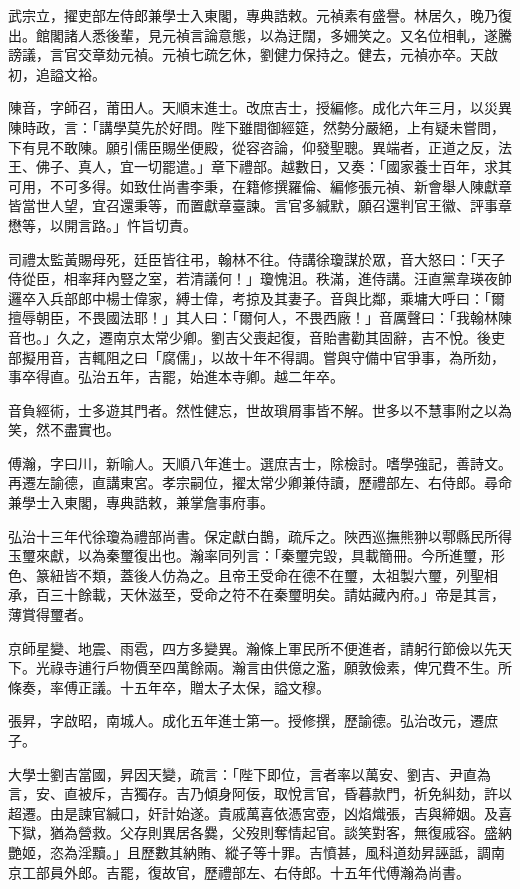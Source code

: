 \begin{pinyinscope}
武宗立，擢吏部左侍郎兼學士入東閣，專典誥敕。元禎素有盛譽。林居久，晚乃復出。館閣諸人悉後輩，見元禎言論意態，以為迂闊，多姍笑之。又名位相軋，遂騰謗議，言官交章劾元禎。元禎七疏乞休，劉健力保持之。健去，元禎亦卒。天啟初，追謚文裕。

陳音，字師召，莆田人。天順末進士。改庶吉士，授編修。成化六年三月，以災異陳時政，言：「講學莫先於好問。陛下雖間御經筵，然勢分嚴絕，上有疑未嘗問，下有見不敢陳。願引儒臣賜坐便殿，從容咨論，仰發聖聰。異端者，正道之反，法王、佛子、真人，宜一切罷遣。」章下禮部。越數日，又奏：「國家養士百年，求其可用，不可多得。如致仕尚書李秉，在籍修撰羅倫、編修張元禎、新會舉人陳獻章皆當世人望，宜召還秉等，而置獻章臺諫。言官多緘默，願召還判官王徽、評事章懋等，以開言路。」忤旨切責。

司禮太監黃賜母死，廷臣皆往弔，翰林不往。侍講徐瓊謀於眾，音大怒曰：「天子侍從臣，相率拜內豎之室，若清議何！」瓊愧沮。秩滿，進侍講。汪直黨韋瑛夜帥邏卒入兵部郎中楊士偉家，縛士偉，考掠及其妻子。音與比鄰，乘墉大呼曰：「爾擅辱朝臣，不畏國法耶！」其人曰：「爾何人，不畏西廠！」音厲聲曰：「我翰林陳音也。」久之，遷南京太常少卿。劉吉父喪起復，音貽書勸其固辭，吉不悅。後吏部擬用音，吉輒阻之曰「腐儒」，以故十年不得調。嘗與守備中官爭事，為所劾，事卒得直。弘治五年，吉罷，始進本寺卿。越二年卒。

音負經術，士多遊其門者。然性健忘，世故瑣屑事皆不解。世多以不慧事附之以為笑，然不盡實也。

傅瀚，字曰川，新喻人。天順八年進士。選庶吉士，除檢討。嗜學強記，善詩文。再遷左諭德，直講東宮。孝宗嗣位，擢太常少卿兼侍讀，歷禮部左、右侍郎。尋命兼學士入東閣，專典誥敕，兼掌詹事府事。

弘治十三年代徐瓊為禮部尚書。保定獻白鵲，疏斥之。陜西巡撫熊翀以鄠縣民所得玉璽來獻，以為秦璽復出也。瀚率同列言：「秦璽完毀，具載簡冊。今所進璽，形色、篆紐皆不類，蓋後人仿為之。且帝王受命在德不在璽，太祖製六璽，列聖相承，百三十餘載，天休滋至，受命之符不在秦璽明矣。請姑藏內府。」帝是其言，薄賞得璽者。

京師星變、地震、雨雹，四方多變異。瀚條上軍民所不便進者，請躬行節儉以先天下。光祿寺逋行戶物價至四萬餘兩。瀚言由供億之濫，願敦儉素，俾冗費不生。所條奏，率傅正議。十五年卒，贈太子太保，謚文穆。

張昇，字啟昭，南城人。成化五年進士第一。授修撰，歷諭德。弘治改元，遷庶子。

大學士劉吉當國，昇因天變，疏言：「陛下即位，言者率以萬安、劉吉、尹直為言，安、直被斥，吉獨存。吉乃傾身阿佞，取悅言官，昏暮款門，祈免糾劾，許以超遷。由是諫官緘口，奸計始遂。貴戚萬喜依憑宮壺，凶焰熾張，吉與締姻。及喜下獄，猶為營救。父存則異居各爨，父歿則奪情起官。談笑對客，無復戚容。盛納艷姬，恣為淫黷。」且歷數其納賄、縱子等十罪。吉憤甚，風科道劾昇誣詆，調南京工部員外郎。吉罷，復故官，歷禮部左、右侍郎。十五年代傅瀚為尚書。


\end{pinyinscope}
